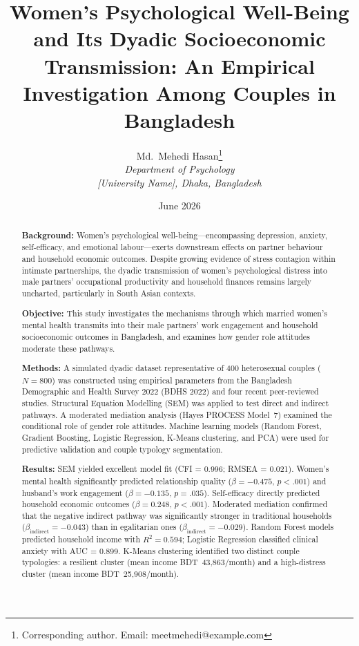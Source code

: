 \documentclass[12pt, a4paper]{article}
\title{%
  \textbf{Women's Psychological Well-Being and Its Dyadic Socioeconomic Transmission: An Empirical Investigation Among Couples in Bangladesh}
}
\author{
  Md.\ Mehedi Hasan\thanks{Corresponding author. Email: meetmehedi@example.com}\\
  \textit{Department of Psychology}\\
  \textit{[University Name], Dhaka, Bangladesh}
}
\date{June 2026}
\begin{document}
\maketitle
\thispagestyle{empty}

\begin{abstract}
\noindent
\textbf{Background:} Women's psychological well-being—encompassing depression, anxiety, self-efficacy, and emotional labour—exerts downstream effects on partner behaviour and household economic outcomes. Despite growing evidence of stress contagion within intimate partnerships, the dyadic transmission of women's psychological distress into male partners' occupational productivity and household finances remains largely uncharted, particularly in South Asian contexts.

\textbf{Objective:} This study investigates the mechanisms through which married women's mental health transmits into their male partners' work engagement and household socioeconomic outcomes in Bangladesh, and examines how gender role attitudes moderate these pathways.

\textbf{Methods:} A simulated dyadic dataset representative of 400 heterosexual couples ($N = 800$) was constructed using empirical parameters from the Bangladesh Demographic and Health Survey 2022 (BDHS 2022) and four recent peer-reviewed studies. Structural Equation Modelling (SEM) was applied to test direct and indirect pathways. A moderated mediation analysis (Hayes PROCESS Model~7) examined the conditional role of gender role attitudes. Machine learning models (Random Forest, Gradient Boosting, Logistic Regression, K-Means clustering, and PCA) were used for predictive validation and couple typology segmentation.

\textbf{Results:} SEM yielded excellent model fit (CFI = 0.996; RMSEA = 0.021). Women's mental health significantly predicted relationship quality ($\beta = -0.475$, $p < .001$) and husband's work engagement ($\beta = -0.135$, $p = .035$). Self-efficacy directly predicted household economic outcomes ($\beta = 0.248$, $p < .001$). Moderated mediation confirmed that the negative indirect pathway was significantly stronger in traditional households ($\beta_{\text{indirect}} = -0.043$) than in egalitarian ones ($\beta_{\text{indirect}} = -0.029$). Random Forest models predicted household income with $R^2 = 0.594$; Logistic Regression classified clinical anxiety with AUC = 0.899. K-Means clustering identified two distinct couple typologies: a resilient cluster (mean income BDT~43,863/month) and a high-distress cluster (mean income BDT~25,908/month).


\end{abstract}
\end{document}
